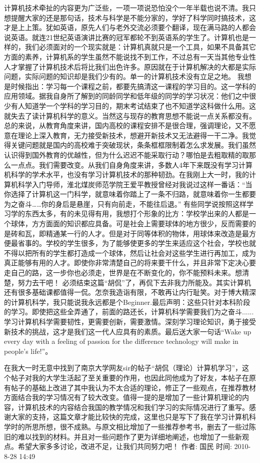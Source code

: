 计算机技术牵扯的内容更为广泛些，一项一项说恐怕没个一年半载也说不清。我只想提醒大家的还是那句话，技术与科学是不能分家的，学好了科学同时搞技术，这才是上上策。犹如英语，原先人们与老外交流必须要个翻译，现在满马路的人都会说英语。就连21世纪英语演讲比赛的冠军都轮不到英语系的学生了。计算机也是一样的，我们必须面对的一个现实就是：计算机真就只是一个工具，如果不具备其它方面的素养，计算机系的学生虽然不能说找不到工作，不过总有一天当其他专业性人才掌握了计算机技术后将比我们出色许多。原因就在于计算机解决的大都是实际问题，实际问题的知识却是我们少有的。单一的计算机技术没有立足之地。
我想是时候指出：学习每一个课程之前，都要先搞清这一课程的学习目的。这一学科的应用领域。据我自身所了解到的同龄同学和低年级的同学的学习状况：他们之中很少有人知道学一个学科的学习目的，期末考试结束了也不知道学这科做什么用。这就失去了读计算机科学的意义。当然这与现存的教育思想不能说一点关系都没有。
总的来说，从教育角度来讲，国内高校的课程安排不是很合理，强调理论，又不愿意在理论上深入教育，无力接受新技术，想避开新技术又无法避得一干二净。我觉得关键问题就是国内的高校难于突破现状，条条框框限制着怎么求发展。我们虽然认识得到国外教育的优越性，但为什么迟迟不能采取行动？哪怕是去粗取精的取那么一点点。我们需要改变。从我们自身角度来讲，多数人4年下来既没有学习计算机科学的学术水平，也没有学习计算机技术的那种韧劲。在我刚上大一时，我的计算机科学入门导师，淮北煤炭师范学院王爱平教授曾经对我说过这样一番话：“当你选择了计算机这一门科学，就意味着你踏上了一条不归路，就意味着你一生都要为之奋斗……你的身后是悬崖，只有向前走，不能往后退。”
有些同学说按照这样学习学的东西太多，有的未见得有用，我想打个形象的比方：学校学出来的人都是一个球体，方方面面的知识都应具备。可是社会上需要球体的地方很少，反而需要的是砖和瓦，即精通某一行的人才。但是对于同等体积的物体，用球体来改造是最方便最省事的。学校的学生很多，为了能够使更多的学生来适应这个社会，学校也就不得以把所有的学生都打造成一个球体，然后让社会对这些学生进行再加工，成为真正能够有用的人才。即使你非常清楚自己的将来要干什么，并且非常下定决心要走自己的路，这一步你也必须走，世界是在不断变化的，你不能预料未来。想清楚，努力去干吧！
必须结束这篇“胡侃”了，再侃下去非我力所能及。其实计算机还有很多基础课都值得一侃。怎奈我造诣有限，不敢再让内行耻笑。对于博大精深的计算机科学，我只能说我永远都是个Beginner.最后声明：这些只针对本科阶段的学习。即使把这些全弄通了，前面的路还长，计算机科学需要我们为之奋斗......学习计算机科学需要韧性，更需要创新，需要激情。深刻学习理论知识，勇于接受新技术的挑战，这才是我们这一代人应具有的素质。最后送大家一句话“Wake up every day with a feeling of passion for the difference technology will make in people's life!”。

在我大一时无意中找到了南京大学网友sir的帖子“胡侃（理论）计算机学习”，这个帖子对我的大学生活起了至关重要的作用，也因此同他成为了好友，本帖子在原有帖子的基础上改进了其中我认为不太合适的理论，修正了一些观点，在推荐教材方面结合我的学习情况有了较大改变。值得一提的是增加了一些计算机理论的内容，计算机技术的内容结合我国的教学情况和我们学习的实际情况进行了重写。感谢大家的支持，这篇文章才能比较快的完成，这里也只是写下了我在学习计算机科学时的所思所想，很不成熟。与原文相比增加了一些推荐参考书，删去了一些过陈旧的难以找到的材料。并且对一些问题作了更为详细地阐述，也增加了一些新观点。希望大家多多讨论，改进不足，让我们共同努力吧！
作者: 国民    时间: 2010-8-28 14:49

